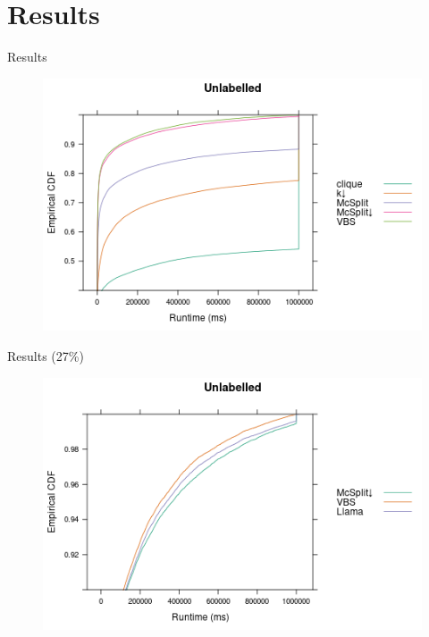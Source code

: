 \documentclass{beamer}
\begin{document}
\section{Results}

\begin{frame}{Results}
  \begin{figure}
    \centering
    \includegraphics[width=\textwidth]{../dissertation/images/ecdf_unlabelled.png}
  \end{figure}
\end{frame}

\begin{frame}{Results (27\%)}
  \begin{figure}
    \centering
    \includegraphics[width=\textwidth]{../dissertation/images/ecdf_unlabelled_llama.png}
  \end{figure}
\end{frame}
\end{document}
